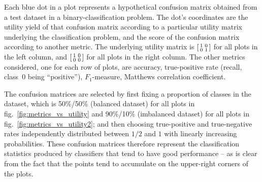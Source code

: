 \documentclass[\ifafour a4paper,12pt,\else a5paper,10pt,\fi%
onecolumn,oneside,article,%
british%
]{memoir}
\theoremstyle{remark}
\theoremstyle{innote}
\renewcommand*{\|}[1][]{\nonscript\:#1\vert\nonscript\:\mathopen{}}
\newcommand*{\fig}{fig.}%
\begin{document}
Each blue dot in a plot represents a hypothetical confusion matrix obtained from a test dataset in a binary-classification problem. The dot's coordinates are the utility yield of that confusion matrix according to a particular utility matrix underlying the classification problem, and the score of the confusion matrix according to another metric. The underlying utility matrix is $\begin{bsmallmatrix} 1&0\\0&1 \end{bsmallmatrix}$ for all plots in the left column, and $\begin{bsmallmatrix} 1&0\\0&0 \end{bsmallmatrix}$ for all plots in the right column. The other metrics considered, one for each row of plots, are accuracy, true-positive rate (recall, class~0 being \enquote{positive}), $F_{1}$-measure, Matthews correlation coefficient.

The confusion matrices are selected by first fixing a proportion of classes in the dataset, which is 50\%/50\% (balanced dataset) for all plots in \fig~\ref{fig:metrics_vs_utility} and 90\%/10\% (imbalanced dataset) for all plots in \fig~\ref{fig:metrics_vs_utility2}; and then choosing true-positive and true-negative rates independently distributed between $1/2$ and $1$ with linearly increasing probabilities. These confusion matrices therefore represent the classification statistics produced %
by classifiers that tend to have good performance -- as is clear from the fact that the points tend to accumulate on the upper-right corners of the plots.
\end{document}
